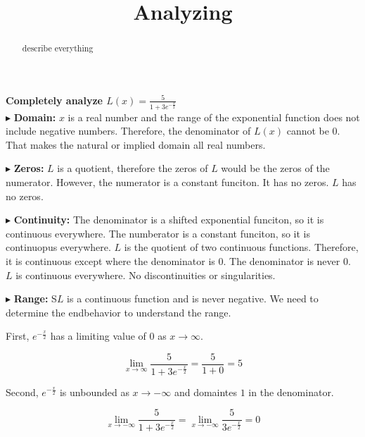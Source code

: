 \documentclass{ximera}
\title{Analyzing}
\begin{document}
\begin{abstract}
describe everything
\end{abstract}
\maketitle







\textbf{Completely analyze $L(x) = \frac{5}{1+3 e^{-\tfrac{x}{2}}}$} \\






$\blacktriangleright$  \textbf{Domain:} $x$ is a real number and the range of the exponential function does not include negative numbers. Therefore, the denominator of $L(x)$ cannot be $0$.  That makes the natural or implied domain all real numbers.


$\blacktriangleright$ \textbf{Zeros:} $L$ is a quotient, therefore the zeros of $L$ would be the zeros of the numerator.  However, the numerator is a constant funciton.  It has no zeros. $L$ has no zeros.



$\blacktriangleright$ \textbf{Continuity:} The denominator is a shifted exponential funciton, so it is continuous everywhere. The numberator is a constant funciton, so it is continuopus everywhere.  $L$ is the quotient of two continuous functions.  Therefore, it is continuous except where the denominator is $0$.  The denominator is never $0$. $L$ is continuous everywhere.  No discontinuities or singularities.




$\blacktriangleright$ \textbf{Range:} S$L$ is a continuous function and is never negative. We need to determine the endbehavior to understand the range.


First, $e^{-\tfrac{x}{2}}$ has a limiting value of $0$ as $x \to \infty$.


\[   \lim_{x \to \infty} \frac{5}{1+3 e^{-\tfrac{x}{2}}} =   \frac{5}{1 + 0}   = 5 \]



Second, $e^{-\tfrac{x}{2}}$ is unbounded as $x \to -\infty$ and domaintes $1$ in the denominator.

\[   \lim_{x \to -\infty} \frac{5}{1+3 e^{-\tfrac{x}{2}}} =   \lim_{x \to -\infty} \frac{5}{3 e^{-\tfrac{x}{2}}}   = 0 \]
\end{document}
